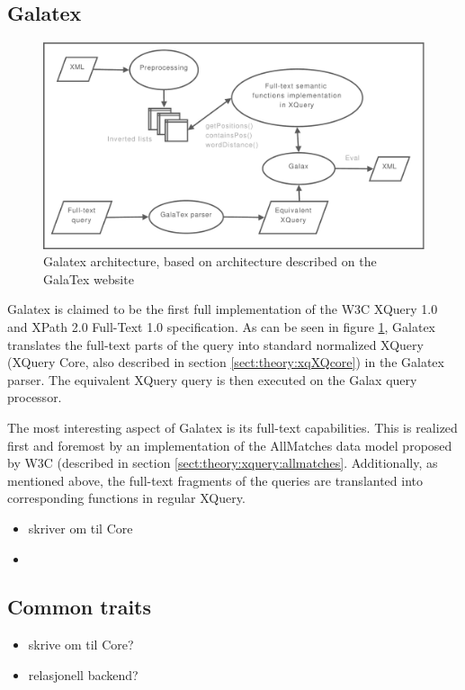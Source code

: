 \subsection{Galatex}
\begin{figure}[h]
  \centering
    \includegraphics[width=1\textwidth]{diagrams/galatex_arch}
  \caption[GalaTex architecture]{Galatex architecture, based on architecture described on
  the GalaTex website\cite{galatex}}
  \label{figure:galatex:arch}
\end{figure}
Galatex is claimed to be the first full implementation of the W3C XQuery 1.0 
and XPath 2.0 Full-Text 1.0 specification\cite{w3c01}. As can be seen in figure
\ref{figure:galatex:arch}, Galatex translates the full-text parts of the query
into standard normalized XQuery (XQuery Core\cite{xquery_semantics}, also
described in section \ref{sect:theory:xqXQcore}) in the Galatex parser. The equivalent
XQuery query is then executed on the Galax query processor.

The most interesting aspect of Galatex is its full-text capabilities. This is
realized first and foremost by an implementation of the AllMatches data model
proposed by W3C (described in section \ref{sect:theory:xquery:allmatches}.
Additionally, as mentioned above, the full-text fragments of the queries are
translanted into corresponding functions in regular XQuery. 

\begin{itemize}
    \item skriver om til Core
    \item 
\end{itemize}

\subsection{Common traits}
\begin{itemize}
    \item skrive om til Core?
    \item relasjonell backend?
\end{itemize}


